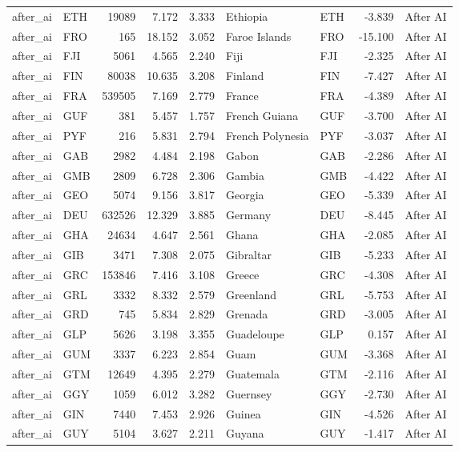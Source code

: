 \begin{tabular}{llrrrllrl}
after\_ai & ETH & 19089 & 7.172 & 3.333 & Ethiopia & ETH & -3.839 & After AI \\
after\_ai & FRO & 165 & 18.152 & 3.052 & Faroe Islands & FRO & -15.100 & After AI \\
after\_ai & FJI & 5061 & 4.565 & 2.240 & Fiji & FJI & -2.325 & After AI \\
after\_ai & FIN & 80038 & 10.635 & 3.208 & Finland & FIN & -7.427 & After AI \\
after\_ai & FRA & 539505 & 7.169 & 2.779 & France & FRA & -4.389 & After AI \\
after\_ai & GUF & 381 & 5.457 & 1.757 & French Guiana & GUF & -3.700 & After AI \\
after\_ai & PYF & 216 & 5.831 & 2.794 & French Polynesia & PYF & -3.037 & After AI \\
after\_ai & GAB & 2982 & 4.484 & 2.198 & Gabon & GAB & -2.286 & After AI \\
after\_ai & GMB & 2809 & 6.728 & 2.306 & Gambia & GMB & -4.422 & After AI \\
after\_ai & GEO & 5074 & 9.156 & 3.817 & Georgia & GEO & -5.339 & After AI \\
after\_ai & DEU & 632526 & 12.329 & 3.885 & Germany & DEU & -8.445 & After AI \\
after\_ai & GHA & 24634 & 4.647 & 2.561 & Ghana & GHA & -2.085 & After AI \\
after\_ai & GIB & 3471 & 7.308 & 2.075 & Gibraltar & GIB & -5.233 & After AI \\
after\_ai & GRC & 153846 & 7.416 & 3.108 & Greece & GRC & -4.308 & After AI \\
after\_ai & GRL & 3332 & 8.332 & 2.579 & Greenland & GRL & -5.753 & After AI \\
after\_ai & GRD & 745 & 5.834 & 2.829 & Grenada & GRD & -3.005 & After AI \\
after\_ai & GLP & 5626 & 3.198 & 3.355 & Guadeloupe & GLP & 0.157 & After AI \\
after\_ai & GUM & 3337 & 6.223 & 2.854 & Guam & GUM & -3.368 & After AI \\
after\_ai & GTM & 12649 & 4.395 & 2.279 & Guatemala & GTM & -2.116 & After AI \\
after\_ai & GGY & 1059 & 6.012 & 3.282 & Guernsey & GGY & -2.730 & After AI \\
after\_ai & GIN & 7440 & 7.453 & 2.926 & Guinea & GIN & -4.526 & After AI \\
after\_ai & GUY & 5104 & 3.627 & 2.211 & Guyana & GUY & -1.417 & After AI \\

\end{tabular}
